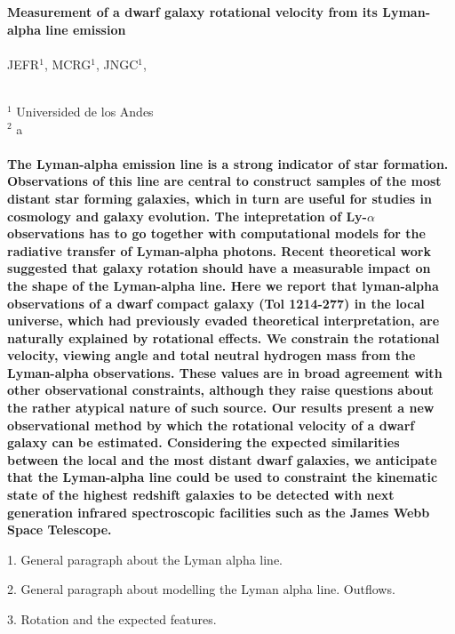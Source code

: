 \documentclass[a4paper, 12pt]{article}
\begin{document}
\pagestyle{empty}
\noindent
\textbf{Measurement of a dwarf galaxy rotational velocity from its Lyman-alpha
  line emission}
\\
\\
JEFR$^{1}$, MCRG$^1$, JNGC$^1$,
\\
\\
\scriptsize
{$^1$ Universided de los Andes
\\
$^2$ a
\normalsize
\\
\\
\textbf{The Lyman-alpha emission line is a strong indicator of star formation.
Observations of this line are central to construct samples of the most
distant star forming galaxies, which in turn are useful for studies in
cosmology and galaxy evolution.  
The intepretation of Ly-$\alpha$ observations has to go together with
computational models for the radiative transfer of Lyman-alpha photons.
Recent theoretical work suggested that galaxy rotation should have a
measurable impact on the shape of the Lyman-alpha line. 
Here we report that lyman-alpha observations of a dwarf compact galaxy (Tol
1214-277) in the local universe, which had previously evaded theoretical 
interpretation, are naturally explained by rotational effects.
We constrain the rotational velocity, viewing angle and total
neutral hydrogen mass from the Lyman-alpha observations.
These values are in broad agreement with other observational
constraints, although  they raise questions about the rather atypical nature
of such source.
Our results present a new observational method by which the rotational
velocity of a dwarf galaxy can be estimated. 
Considering the expected similarities between the local and the most
distant dwarf galaxies, we anticipate that the Lyman-alpha line could be
used to constraint the kinematic state of the highest redshift
galaxies to be detected with next generation infrared spectroscopic
facilities such as the James Webb Space Telescope.}




1. General paragraph about the Lyman alpha line.

2. General paragraph about modelling the Lyman alpha
line. Outflows.

3. Rotation and the expected features.


}
\end{document}
